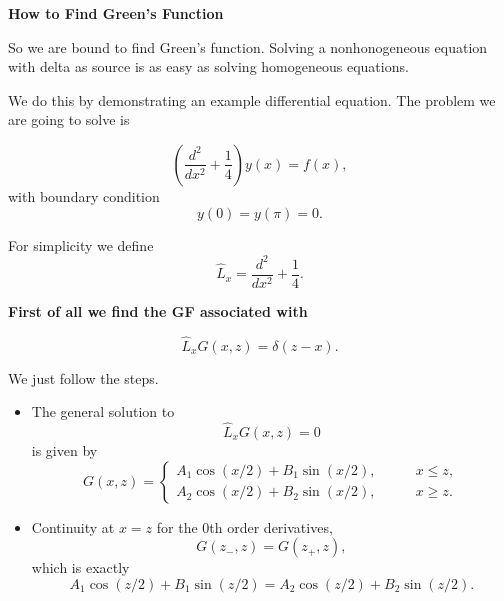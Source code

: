 \documentclass{tufte-handout}
\begin{document}


\begin{framed}


{\bf How to Find Green's Function}
\vspace{1em}

So we are bound to find Green's function. Solving a nonhonogeneous equation with delta as source is as easy as solving homogeneous equations.

We do this by demonstrating an example differential equation. The problem we are going to solve is

\begin{equation*}
    \left(\frac{d^2}{dx^2} + \frac{1}{4}\right) y(x) = f(x),
\end{equation*}
with boundary condition
\begin{equation}
y(0) = y(\pi) = 0.\label{eqn-green-function-example2-bc}
\end{equation}


For simplicity we define 
\begin{equation*}
    \hat L_x = \frac{d^2}{dx^2} + \frac{1}{4}.
\end{equation*}

{\bf First of all we find the GF associated with}

\begin{equation*}
    \hat L_x G(x,z) = \delta(z-x).
\end{equation*}

We just follow the steps.

\begin{itemize}
\item The general solution to 
    \begin{equation*}
        \hat L_x G(x,z) = 0
    \end{equation*}
    is given by
    \begin{equation*}
        G(x,z) = \begin{cases}
        A_1\cos (x/2) + B_1 \sin(x/2), & \qquad x \leq z, \\
        A_2\cos (x/2) + B_2 \sin(x/2), & \qquad x \geq z.
        \end{cases}
    \end{equation*}



\item Continuity at $x=z$ for the 0th order derivatives,
\begin{equation*}
    G(z_-,z) = G(z_+,z),
\end{equation*}
which is exactly
\begin{equation}
    A_1\cos(z/2) + B_1 \sin(z/2) = A_2 \cos(z/2) + B_2\sin(z/2).\label{eqn-green-function-example2-continuity}
\end{equation}


\end{itemize}
\end{framed}
\end{document}
